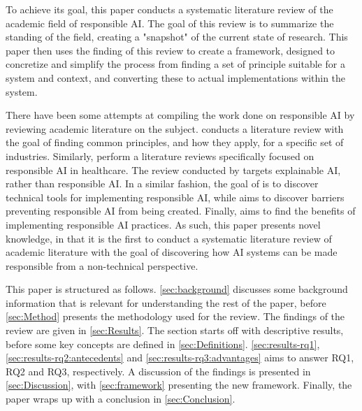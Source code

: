 To achieve its goal, this paper conducts a systematic literature review of the academic field of responsible AI. The goal of this review is to summarize the standing of the field, creating a "snapshot" of the current state of research. This paper then uses the finding of this review to create a framework, designed to concretize and simplify the process from finding a set of principle suitable for a system and context, and converting these to actual implementations within the system.

There have been some attempts at compiling the work done on responsible AI by reviewing academic literature on the subject. \textcite{Anagnostou_2022} conducts a literature review with the goal of finding common principles, and how they apply, for a specific set of industries. Similarly, \textcite{Lukkien_2021,Siala_2022} perform a literature reviews specifically focused on responsible AI in healthcare. The review conducted by \textcite{BarredoArrieta_2020} targets explainable AI, rather than responsible AI. In a similar fashion, the goal of \textcite{Morley_2020} is to discover technical tools for implementing responsible AI, while \textcite{Merhi_2022} aims to discover barriers preventing responsible AI from being created. Finally, \textcite{WangY_2020} aims to find the benefits of implementing responsible AI practices. As such, this paper presents novel knowledge, in that it is the first to conduct a systematic literature review of academic literature with the goal of discovering how AI systems can be made responsible from a non-technical perspective.

This paper is structured as follows. \autoref{sec:background} discusses some background information that is relevant for understanding the rest of the paper, before \autoref{sec:Method} presents the methodology used for the review. The findings of the review are given in \autoref{sec:Results}. The section starts off with descriptive results, before some key concepts are defined in \autoref{sec:Definitions}. \autoref{sec:results-rq1}, \ref{sec:results-rq2:antecedents} and \ref{sec:results-rq3:advantages} aims to answer RQ1, RQ2 and RQ3, respectively. A discussion of the findings is presented in \autoref{sec:Discussion}, with \autoref{sec:framework} presenting the new framework. Finally, the paper wraps up with a conclusion in \autoref{sec:Conclusion}.

